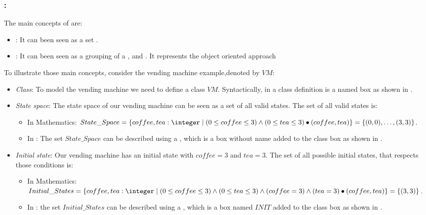 \subsubsection{:} 
\label{main_concepts_oz} 
The main concepts of \oz{} are:
\begin{itemize}
\item {}: It can been seen as a set \cite{woodcock}.
\item {}: It can been seen as a grouping of a ,  and  \cite{kenji}. It represents the object oriented approach 
\end{itemize}

To illustrate those main concepts, consider the vending machine example,denoted by $VM$:
\begin{itemize}
\item \textit{Class}: To model the vending machine we need to define a class $VM$. Syntactically, in \oz{}
a class definition is a named box as shown in .


\item \textit{State space}: The state space of our vending machine can be seen as a set of all valid states. The set of all valid states is:
\begin{itemize}
\item In Mathematics: $State\_Space=\{coffee,tea: \integer\mid (0 \leq  coffee \leq 3) \wedge
(0 \leq  tea \leq 3)\bullet(coffee,tea)\}  =\{\pair{0}{0},\dots,\pair{3}{3}\}$.
\item In \oz{}: The set $State\_Space$ can be described using a , which is a box without name added to the class box as shown in .
\end{itemize}


\item \textit{Initial state}: Our vending machine has an initial state with $coffee = 3$ and $tea = 3$. The set of all possible initial states, that respects those conditions is:  
\begin{itemize}
\item In Mathematics: $Initial\_States =\{coffee,tea: \integer\mid (0 \leq  coffee \leq 3) \wedge
(0 \leq  tea \leq 3)\wedge (coffee = 3) \wedge (tea = 3)\bullet(coffee,tea)\}  =\{\pair{3}{3}\}$.
\item In \oz{}: the set $Initial\_States$ can be described using a , which is a box named $INIT$ added to the class box  as shown in .
\end{itemize}



\end{itemize}
